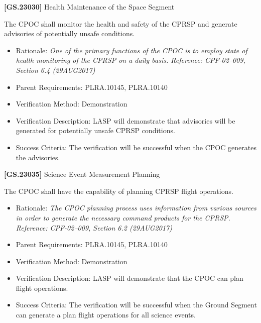 \documentclass[12pt,oneside,oldfontcommands]{memoir}
\begin{document}
\textbf{[GS.23030]} Health Maintenance of the Space Segment

The \gls{CPOC} shall monitor the health and safety of the \gls{CPRSP} and generate advisories of potentially unsafe conditions.

\begin{itemize}
\item{} Rationale: \emph{One of the primary functions of the CPOC is to employ state of health monitoring of the CPRSP on a daily basis. Reference: CPF-02--009, Section 6.4 (29AUG2017)}

\item{} Parent Requirements: PLRA.10145, PLRA.10140

\item{} Verification Method: Demonstration

\item{} Verification Description: \gls{LASP} will demonstrate that advisories will be generated for potentially unsafe \gls{CPRSP} conditions.

\item{} Success Criteria: The verification will be successful when the \gls{CPOC} generates the advisories.

\end{itemize}

\textbf{[GS.23035]} Science Event Measurement Planning

The \gls{CPOC} shall have the capability of planning \gls{CPRSP} flight operations.

\begin{itemize}
\item{} Rationale: \emph{The CPOC planning process uses information from various sources in order to generate the necessary command products for the CPRSP. Reference: CPF-02--009, Section 6.2 (29AUG2017)}

\item{} Parent Requirements: PLRA.10145, PLRA.10140

\item{} Verification Method: Demonstration

\item{} Verification Description: \gls{LASP} will demonstrate that the \gls{CPOC} can plan flight operations.

\item{} Success Criteria: The verification will be successful when the Ground Segment can generate a plan flight operations for all science events.

\end{itemize}
\end{document}
